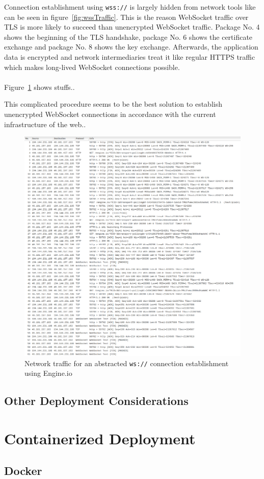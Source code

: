 \noindent
Connection establishment using \texttt{wss://} is largely hidden from network tools like can be seen in figure~\ref{fig:wssTraffic}. This is the reason WebSocket traffic over TLS is more likely to succeed than unencrypted WebSocket traffic. Package No. 4 shows the beginning of the TLS handshake, package No. 6 shows the certificate exchange and package No. 8 shows the key exchange. Afterwards, the application data is encrypted and network intermediaries treat it like regular HTTPS traffic which makes long-lived WebSocket connections possible.
\\ \\
Figure~\ref{fig:engineioTraffic} shows stuffs..

This complicated procedure seems to be the best solution to establish unencrypted WebSocket connections in accordance with the current infrastructure of the web..
\newpage
\begin{figure}[h!]
	\centering
	\includegraphics[width=1\textwidth]{images/engineio_dump}
	\caption{Network traffic for an abstracted \texttt{ws://} connection establishment using Engine.io}
	\label{fig:engineioTraffic}
\end{figure}

\subsection{Other Deployment Considerations}

\section{Containerized Deployment}

\subsection{Docker}